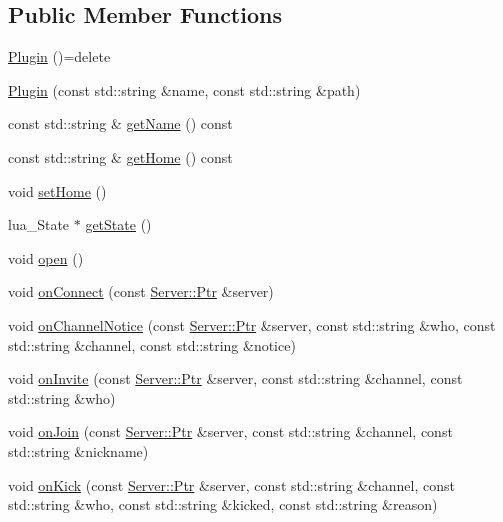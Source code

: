 \subsection*{Public Member Functions}
\begin{DoxyCompactItemize}
\item 
\hyperlink{a00051_a0b194ef6f4a353d0e3d3fab8eb1ff985}{Plugin} ()=delete
\item 
\hyperlink{a00051_ae53036d2b86889b3578f11fc1466eba3}{Plugin} (const std\-::string \&name, const std\-::string \&path)
\item 
const std\-::string \& \hyperlink{a00051_ae81c0970a75f2a8cada6de0e52fbf06b}{get\-Name} () const 
\item 
const std\-::string \& \hyperlink{a00051_a9193bf3060c54509b7762682fe014b4d}{get\-Home} () const 
\item 
void \hyperlink{a00051_a3ac8cac0b4082737cfa8e6df7f96a633}{set\-Home} ()
\item 
lua\-\_\-\-State $\ast$ \hyperlink{a00051_aa6269862890fbeb14285dff7f907b519}{get\-State} ()
\item 
void \hyperlink{a00051_a8702a832caaa565eac28814826a4d780}{open} ()
\item 
void \hyperlink{a00051_aad6c7a4eab95b97390d43ebbb931cd27}{on\-Connect} (const \hyperlink{a00055_aea3f9694df81348b909814ac6f84f874}{Server\-::\-Ptr} \&server)
\item 
void \hyperlink{a00051_aca1e3d821a3523a4cb68b9819c27b83c}{on\-Channel\-Notice} (const \hyperlink{a00055_aea3f9694df81348b909814ac6f84f874}{Server\-::\-Ptr} \&server, const std\-::string \&who, const std\-::string \&channel, const std\-::string \&notice)
\item 
void \hyperlink{a00051_a44aeb1433c18bb7a6f1136932a224596}{on\-Invite} (const \hyperlink{a00055_aea3f9694df81348b909814ac6f84f874}{Server\-::\-Ptr} \&server, const std\-::string \&channel, const std\-::string \&who)
\item 
void \hyperlink{a00051_ab0da6de0d4c330b5cab6dd6dfd171edf}{on\-Join} (const \hyperlink{a00055_aea3f9694df81348b909814ac6f84f874}{Server\-::\-Ptr} \&server, const std\-::string \&channel, const std\-::string \&nickname)
\item 
void \hyperlink{a00051_acf227d7d4deeb421ac7b449e295f7893}{on\-Kick} (const \hyperlink{a00055_aea3f9694df81348b909814ac6f84f874}{Server\-::\-Ptr} \&server, const std\-::string \&channel, const std\-::string \&who, const std\-::string \&kicked, const std\-::string \&reason)
\item 

\end{DoxyCompactItemize}
